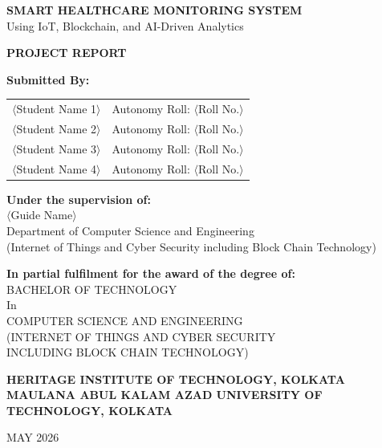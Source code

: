 \begin{titlepage}
\centering
\vspace*{2cm}

{\LARGE\bfseries SMART HEALTHCARE MONITORING SYSTEM\\[0.3cm]}
{\large Using IoT, Blockchain, and AI-Driven Analytics\\[1.5cm]}

{\Large\bfseries PROJECT REPORT\\[2cm]}

{\large\bfseries Submitted By:\\[0.5cm]}

\begin{tabular}{ll}
$\langle$Student Name 1$\rangle$ & Autonomy Roll: $\langle$Roll No.$\rangle$ \\
$\langle$Student Name 2$\rangle$ & Autonomy Roll: $\langle$Roll No.$\rangle$ \\
$\langle$Student Name 3$\rangle$ & Autonomy Roll: $\langle$Roll No.$\rangle$ \\
$\langle$Student Name 4$\rangle$ & Autonomy Roll: $\langle$Roll No.$\rangle$ \\
\end{tabular}

\vspace{1.5cm}
{\large\bfseries Under the supervision of:\\[0.3cm]}
{\large $\langle$Guide Name$\rangle$\\[0.2cm]}
{\normalsize Department of Computer Science and Engineering\\
(Internet of Things and Cyber Security including Block Chain Technology)\\[1.5cm]}

{\large\bfseries In partial fulfilment for the award of the degree of:\\[0.5cm]}
{\large BACHELOR OF TECHNOLOGY\\
In\\
COMPUTER SCIENCE AND ENGINEERING\\
(INTERNET OF THINGS AND CYBER SECURITY\\
INCLUDING BLOCK CHAIN TECHNOLOGY)\\[1cm]}

{\large\bfseries HERITAGE INSTITUTE OF TECHNOLOGY, KOLKATA\\[0.2cm]}
{\large\bfseries MAULANA ABUL KALAM AZAD UNIVERSITY OF TECHNOLOGY, KOLKATA\\[1.5cm]}

{\large MAY 2026}
\end{titlepage}
